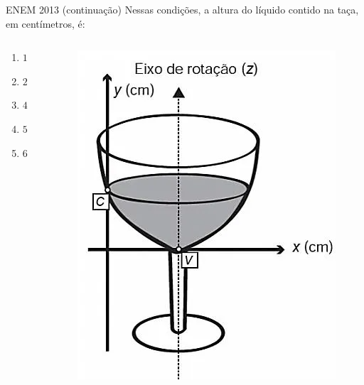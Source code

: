 \documentclass[11pt]{beamer}
\newif\ifgab
\newcommand{\gab}[1]{%
  \ifgab
    \textcolor{red!80!black}{\textbf{#1}}%
  \else
    #1%
  \fi
}
\begin{document}
\begin{frame}{ENEM 2013 (continuação)}
    Nessas condições, a altura do líquido contido na taça, em centímetros, é:
    \begin{columns}
        \begin{column}{0.4\textwidth}
            \begin{enumerate}[a]
                \item $1$ 
                \item $2$  
                \item $4$
                \item $5$ 
                \item \gab{$6$} %
            \end{enumerate}
        \end{column}

        \begin{column}{0.6\textwidth}
            \centering
            \includegraphics[width=0.7\linewidth]{imagens/enem 2013.png}
        \end{column}
    \end{columns}
    
\end{frame}
\end{document}
